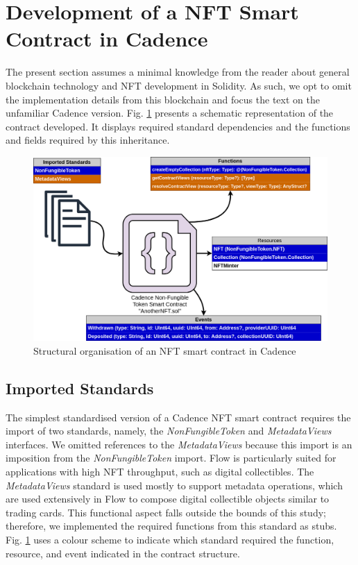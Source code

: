 \documentclass[../NFTComp_IEEE.tex]{subfiles}
\begin{document}
\section{Development of a NFT Smart Contract in Cadence}
\label{sec:cadence_development}
The present section assumes a minimal knowledge from the reader about general blockchain technology and NFT development in Solidity. As such, we opt to omit the implementation details from this blockchain and focus the text on the unfamiliar Cadence version. Fig. \ref{fig:cadence_nft_contract} presents a schematic representation of the contract developed. It displays required standard dependencies and the functions and fields required by this inheritance.

\begin{figure}[h!]
    \centering
    \includegraphics[width=\columnwidth]{Images/almei1.png}
    \caption{Structural organisation of an NFT smart contract in Cadence}
    \label{fig:cadence_nft_contract}
\end{figure}

\subsection{Imported Standards}
The simplest standardised version of a Cadence NFT smart contract requires the import of two standards, namely, the \textit{NonFungibleToken} and \textit{MetadataViews} interfaces. We omitted references to the \textit{MetadataViews} because this import is an imposition from the \textit{NonFungibleToken} import. Flow is particularly suited for applications with high NFT throughput, such as digital collectibles. The \textit{MetadataViews} standard is used mostly to support metadata operations, which are used extensively in Flow to compose digital collectible objects similar to trading cards. This functional aspect falls outside the bounds of this study; therefore, we implemented the required functions from this standard as stubs. Fig. \ref{fig:cadence_nft_contract} uses a colour scheme to indicate which standard required the function, resource, and event indicated in the contract structure.
\end{document}
